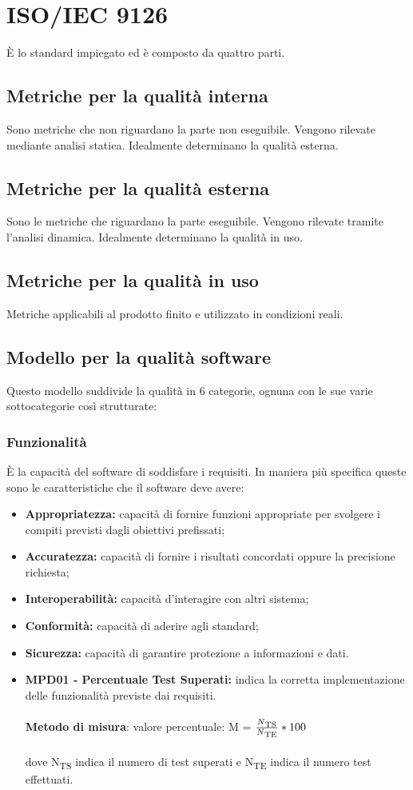 \label{sec:A}
\section{ISO/IEC 9126}
È lo standard impiegato ed è composto da quattro parti.
\subsection{Metriche per la qualità interna}
Sono metriche che non riguardano la parte non eseguibile. Vengono rilevate mediante analisi statica. Idealmente determinano la qualità esterna.
\subsection{Metriche per la qualità esterna}
Sono le metriche che riguardano la parte eseguibile. Vengono rilevate tramite l'analisi dinamica. Idealmente determinano la qualità in uso.
\subsection{Metriche per la qualità in uso}
Metriche applicabili al prodotto finito e utilizzato in condizioni reali.
\subsection{Modello per la qualità software}
Questo modello suddivide la qualità in 6 categorie, ognuna con le sue varie sottocategorie così strutturate:
\subsubsection{Funzionalità}
È la capacità del software di soddisfare i requisiti. In maniera più specifica queste sono le caratteristiche che il software deve avere:
\begin{itemize}
    \item \textbf{Appropriatezza:} capacità di fornire funzioni appropriate per svolgere i compiti previsti dagli obiettivi prefissati;
    \item \textbf{Accuratezza:} capacità di fornire i risultati concordati oppure la precisione richiesta;
    \item \textbf{Interoperabilità:} capacità  d'interagire con altri sistema;
    \item \textbf{Conformità:} capacità di aderire agli standard;
    \item \textbf{Sicurezza:} capacità di garantire protezione a informazioni e dati.
\end{itemize}
\begin{itemize}
    \item \textbf{MPD01 - Percentuale Test Superati:} indica la corretta implementazione delle funzionalità previste dai requisiti.\\
          \\\textbf{Metodo di misura}: valore percentuale: M = $\frac{N\textsubscript{TS}}{N\textsubscript{TE}}*100$ \\
          \\dove N\textsubscript{TS} indica il numero di test superati e N\textsubscript{TE} indica il numero test effettuati.
\end{itemize}
